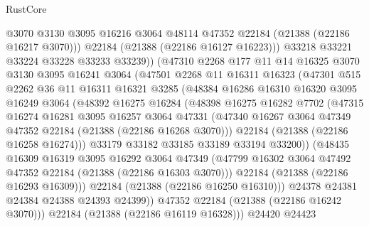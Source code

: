 \begin{lexlean}{RustCore}
\begin{coremodule}
                  @3070
                  @3130
                  @3095
                  @16216
                  @3064
                  @48114
                  @47352
                  @22184
                  (@21388 (@22186 @16217 @3070)))
                @22184
                (@21388 (@22186 @16127 @16223)))
              @33218
              @33221
              @33224
              @33228
              @33233
              @33239))
          (@47310
            @2268
            @177
            @11
            @14
            @16325
            @3070
            @3130
            @3095
            @16241
            @3064
            (@47501
              @2268
              @11
              @16311
              @16323
              (@47301
                @515
                @2262
                @36
                @11
                @16311
                @16321
                @3285
                (@48384
                  @16286
                  @16310
                  @16320
                  @3095
                  @16249
                  @3064
                  (@48392
                    @16275
                    @16284
                    (@48398
                      @16275
                      @16282
                      @7702
                      (@47315
                        @16274
                        @16281
                        @3095
                        @16257
                        @3064
                        @47331
                        (@47340 @16267 @3064 @47349 @47352 @22184 (@21388 (@22186 @16268 @3070)))
                        @22184
                        (@21388 (@22186 @16258 @16274)))
                      @33179
                      @33182
                      @33185
                      @33189
                      @33194
                      @33200))
                  (@48435
                    @16309
                    @16319
                    @3095
                    @16292
                    @3064
                    @47349
                    (@47799 @16302 @3064 @47492 @47352 @22184 (@21388 (@22186 @16303 @3070)))
                    @22184
                    (@21388 (@22186 @16293 @16309)))
                  @22184
                  (@21388 (@22186 @16250 @16310)))
                @24378
                @24381
                @24384
                @24388
                @24393
                @24399))
            @47352
            @22184
            (@21388 (@22186 @16242 @3070)))
          @22184
          (@21388 (@22186 @16119 @16328)))
        @24420
        @24423

\end{coremodule}
\end{lexlean}

